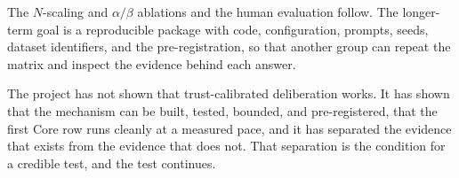 The $N$-scaling and $\alpha/\beta$ ablations and the human evaluation follow. The longer-term goal is a reproducible package with code, configuration, prompts, seeds, dataset identifiers, and the pre-registration, so that another group can repeat the matrix and inspect the evidence behind each answer.

The project has not shown that trust-calibrated deliberation works. It has shown that the mechanism can be built, tested, bounded, and pre-registered, that the first Core row runs cleanly at a measured pace, and it has separated the evidence that exists from the evidence that does not. That separation is the condition for a credible test, and the test continues.
